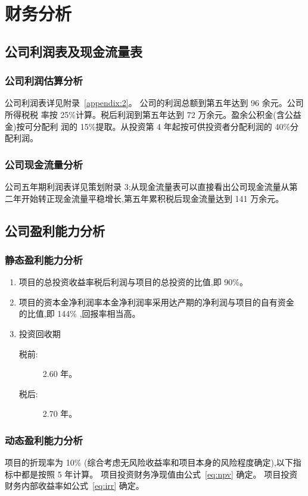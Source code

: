 \chapter{财务分析}
\section{公司利润表及现金流量表}

\subsection{公司利润估算分析}
公司利润表详见附录~\ref{appendix:2}。
公司的利润总额到第五年达到 96 余元。公司所得税税
率按 25\%计算。税后利润到第五年达到 72 万余元。盈余公积金(含公益金)按可分配利
润的 15\%提取。从投资第 4 年起按可供投资者分配利润的 40\%分配利润。

\subsection{公司现金流量分析}
公司五年期利润表详见策划附录 3;从现金流量表可以直接看出公司现金流量从第
二年开始转正现金流量平稳增长,第五年累积税后现金流量达到 141 万余元。

\section{公司盈利能力分析}
\subsection{静态盈利能力分析}
\begin{enumerate}[(1)]
\item
项目的总投资收益率税后利润与项目的总投资的比值,即 90\%。
\item
项目的资本金净利润率本金净利润率采用达产期的净利润与项目的自有资金
的比值,即 144\% ,回报率相当高。
\item
投资回收期
\begin{description}
        \item[税前:] 2.60 年。
        \item[税后:] 2.70 年。
\end{description}
\end{enumerate}

\subsection{动态盈利能力分析}
项目的折现率为 10\% (综合考虑无风险收益率和项目本身的风险程度确定),以下指
标中都是按照 5 年计算。
项目投资财务净现值由公式~\eqref{eq:npv} 确定。
项目投资财务内部收益率如公式~\eqref{eq:irr} 确定。

